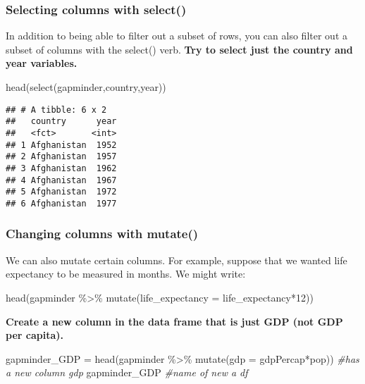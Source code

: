 \documentclass[
]{article}
\newenvironment{Shaded}{\begin{snugshade}}{\end{snugshade}}
\newcommand{\AttributeTok}[1]{\textcolor[rgb]{0.77,0.63,0.00}{#1}}
\newcommand{\CommentTok}[1]{\textcolor[rgb]{0.56,0.35,0.01}{\textit{#1}}}
\newcommand{\DecValTok}[1]{\textcolor[rgb]{0.00,0.00,0.81}{#1}}
\newcommand{\FunctionTok}[1]{\textcolor[rgb]{0.00,0.00,0.00}{#1}}
\newcommand{\NormalTok}[1]{#1}
\newcommand{\OtherTok}[1]{\textcolor[rgb]{0.56,0.35,0.01}{#1}}
\newcommand{\SpecialCharTok}[1]{\textcolor[rgb]{0.00,0.00,0.00}{#1}}
\begin{document}
\hypertarget{selecting-columns-with-select}{%
\subsubsection{Selecting columns with
select()}\label{selecting-columns-with-select}}

In addition to being able to filter out a subset of rows, you can also
filter out a subset of columns with the select() verb. \textbf{Try to
select just the country and year variables.}

\begin{Shaded}
\begin{Highlighting}[]
\FunctionTok{head}\NormalTok{(}\FunctionTok{select}\NormalTok{(gapminder,country,year))}
\end{Highlighting}
\end{Shaded}

\begin{verbatim}
## # A tibble: 6 x 2
##   country      year
##   <fct>       <int>
## 1 Afghanistan  1952
## 2 Afghanistan  1957
## 3 Afghanistan  1962
## 4 Afghanistan  1967
## 5 Afghanistan  1972
## 6 Afghanistan  1977
\end{verbatim}

\hypertarget{changing-columns-with-mutate}{%
\subsubsection{Changing columns with
mutate()}\label{changing-columns-with-mutate}}

We can also mutate certain columns. For example, suppose that we wanted
life expectancy to be measured in months. We might write:

\begin{Shaded}
\begin{Highlighting}[]
\FunctionTok{head}\NormalTok{(gapminder }\SpecialCharTok{\%\textgreater{}\%} \FunctionTok{mutate}\NormalTok{(}\AttributeTok{life\_expectancy =}\NormalTok{ life\_expectancy}\SpecialCharTok{*}\DecValTok{12}\NormalTok{))}
\end{Highlighting}
\end{Shaded}

\textbf{Create a new column in the data frame that is just GDP (not GDP
per capita).}

\begin{Shaded}
\begin{Highlighting}[]
\NormalTok{gapminder\_GDP }\OtherTok{=} \FunctionTok{head}\NormalTok{(gapminder }\SpecialCharTok{\%\textgreater{}\%} \FunctionTok{mutate}\NormalTok{(}\AttributeTok{gdp =}\NormalTok{ gdpPercap}\SpecialCharTok{*}\NormalTok{pop)) }\CommentTok{\#has a new column \textquotesingle{}gdp\textquotesingle{}}
\NormalTok{gapminder\_GDP                                                   }\CommentTok{\#name of new a df}
\end{Highlighting}
\end{Shaded}
\end{document}
